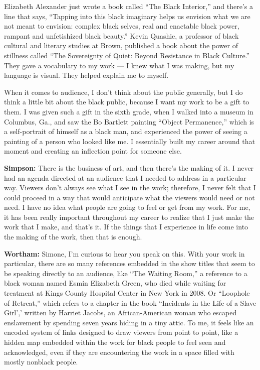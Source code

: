 Elizabeth Alexander just wrote a book called ``The Black Interior,'' and
there's a line that says, ``Tapping into this black imaginary helps us
envision what we are not meant to envision: complex black selves, real
and enactable black power, rampant and unfetishized black beauty.''
Kevin Quashie, a professor of black cultural and literary studies at
Brown, published a book about the power of stillness called ``The
Sovereignty of Quiet: Beyond Resistance in Black Culture.'' They gave a
vocabulary to my work --- I knew what I was making, but my language is
visual. They helped explain me to myself.

When it comes to audience, I don't think about the public generally, but
I do think a little bit about the black public, because I want my work
to be a gift to them. I was given such a gift in the sixth grade, when I
walked into a museum in Columbus, Ga., and saw the Bo Bartlett painting
``Object Permanence,'' which is a self-portrait of himself as a black
man, and experienced the power of seeing a painting of a person who
looked like me. I essentially built my career around that moment and
creating an inflection point for someone else.

\textbf{Simpson:} There is the business of art, and then there's the
making of it. I never had an agenda directed at an audience that I
needed to address in a particular way. Viewers don't always see what I
see in the work; therefore, I never felt that I could proceed in a way
that would anticipate what the viewers would need or not need. I have no
idea what people are going to feel or get from my work. For me, it has
been really important throughout my career to realize that I just make
the work that I make, and that's it. If the things that I experience in
life come into the making of the work, then that is enough.

\textbf{Wortham:} Simone, I'm curious to hear you speak on this. With
your work in particular, there are so many references embedded in the
show titles that seem to be speaking directly to an audience, like ``The
Waiting Room,'' a reference to a black woman named Esmin Elizabeth
Green, who died while waiting for treatment at Kings County Hospital
Center in New York in 2008. Or ``Loophole of Retreat,'' which refers to
a chapter in the book ``Incidents in the Life of a Slave Girl',' written
by Harriet Jacobs, an African-American woman who escaped enslavement by
spending seven years hiding in a tiny attic. To me, it feels like an
encoded system of links designed to draw viewers from point to point,
like a hidden map embedded within the work for black people to feel seen
and acknowledged, even if they are encountering the work in a space
filled with mostly nonblack people.

